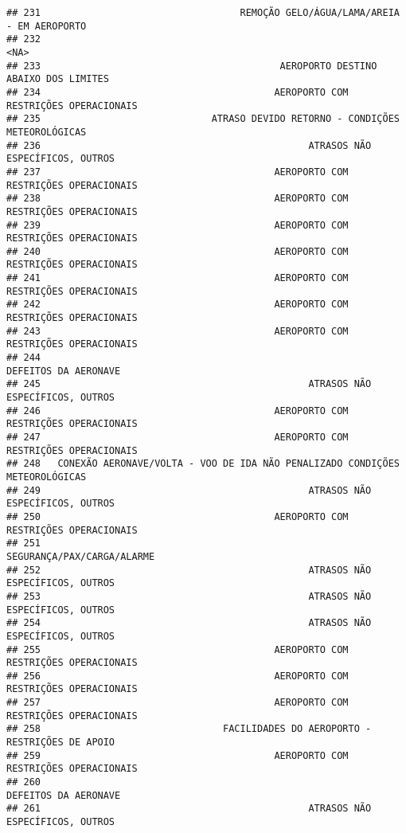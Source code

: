 \documentclass[
]{article}
\begin{document}
\begin{verbatim}
## 231                                   REMOÇÃO GELO/ÁGUA/LAMA/AREIA - EM AEROPORTO
## 232                                                                          <NA>
## 233                                          AEROPORTO DESTINO ABAIXO DOS LIMITES
## 234                                         AEROPORTO COM RESTRIÇÕES OPERACIONAIS
## 235                              ATRASO DEVIDO RETORNO - CONDIÇÕES METEOROLÓGICAS
## 236                                               ATRASOS NÃO ESPECÍFICOS, OUTROS
## 237                                         AEROPORTO COM RESTRIÇÕES OPERACIONAIS
## 238                                         AEROPORTO COM RESTRIÇÕES OPERACIONAIS
## 239                                         AEROPORTO COM RESTRIÇÕES OPERACIONAIS
## 240                                         AEROPORTO COM RESTRIÇÕES OPERACIONAIS
## 241                                         AEROPORTO COM RESTRIÇÕES OPERACIONAIS
## 242                                         AEROPORTO COM RESTRIÇÕES OPERACIONAIS
## 243                                         AEROPORTO COM RESTRIÇÕES OPERACIONAIS
## 244                                                          DEFEITOS DA AERONAVE
## 245                                               ATRASOS NÃO ESPECÍFICOS, OUTROS
## 246                                         AEROPORTO COM RESTRIÇÕES OPERACIONAIS
## 247                                         AEROPORTO COM RESTRIÇÕES OPERACIONAIS
## 248   CONEXÃO AERONAVE/VOLTA - VOO DE IDA NÃO PENALIZADO CONDIÇÕES METEOROLÓGICAS
## 249                                               ATRASOS NÃO ESPECÍFICOS, OUTROS
## 250                                         AEROPORTO COM RESTRIÇÕES OPERACIONAIS
## 251                                                    SEGURANÇA/PAX/CARGA/ALARME
## 252                                               ATRASOS NÃO ESPECÍFICOS, OUTROS
## 253                                               ATRASOS NÃO ESPECÍFICOS, OUTROS
## 254                                               ATRASOS NÃO ESPECÍFICOS, OUTROS
## 255                                         AEROPORTO COM RESTRIÇÕES OPERACIONAIS
## 256                                         AEROPORTO COM RESTRIÇÕES OPERACIONAIS
## 257                                         AEROPORTO COM RESTRIÇÕES OPERACIONAIS
## 258                                FACILIDADES DO AEROPORTO - RESTRIÇÕES DE APOIO
## 259                                         AEROPORTO COM RESTRIÇÕES OPERACIONAIS
## 260                                                          DEFEITOS DA AERONAVE
## 261                                               ATRASOS NÃO ESPECÍFICOS, OUTROS

\end{verbatim}
\end{document}
